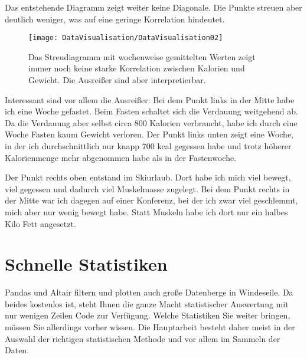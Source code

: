




\medskip

Das entstehende Diagramm zeigt weiter keine Diagonale. Die Punkte streuen aber deutlich weniger, was auf eine geringe Korrelation hindeutet.

\begin{figure}
	\texttt{[image: DataVisualisation/DataVisualisation02]}
	\caption[Streudiagramm mit wochenweise gemittelten Werte]{Das Streudiagramm mit wochenweise gemittelten Werten zeigt immer noch keine starke Korrelation zwischen Kalorien und Gewicht. Die Ausreißer sind aber interpretierbar.}
\end{figure}


Interessant sind vor allem die Ausreißer: Bei dem Punkt links in der Mitte habe ich eine Woche gefastet. Beim Fasten schaltet sich die Verdauung weitgehend ab. Da die Verdauung aber selbst circa 800 Kalorien verbraucht, habe ich durch eine Woche Fasten kaum Gewicht verloren. Der Punkt links unten zeigt eine Woche, in der ich durchschnittlich nur knapp 700 kcal gegessen habe und trotz höherer Kalorienmenge mehr abgenommen habe als in der Fastenwoche.

Der Punkt rechts oben entstand im Skiurlaub. Dort habe ich mich viel bewegt, viel gegessen und dadurch viel Muskelmasse zugelegt. Bei dem Punkt rechts in der Mitte war ich dagegen auf einer Konferenz, bei der ich zwar viel geschlemmt, mich aber nur wenig bewegt habe. Statt Muskeln habe ich dort nur ein halbes Kilo Fett angesetzt.

\section{Schnelle Statistiken}

Pandas und Altair filtern und plotten auch große Datenberge in Windeseile. Da beides kostenlos ist, steht Ihnen die ganze Macht statistischer Auswertung mit nur wenigen Zeilen Code zur Verfügung. Welche Statistiken Sie weiter bringen, müssen Sie allerdings vorher wissen. Die Hauptarbeit besteht daher meist in der Auswahl der richtigen statistischen Methode und vor allem im Sammeln der Daten.


